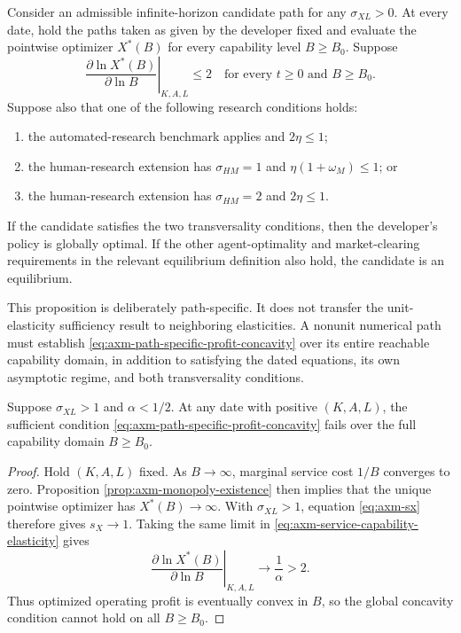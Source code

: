 \begin{proposition}
\label{prop:axm-path-specific-sufficiency}
Consider an admissible infinite-horizon candidate path for any
\(\sigma_{XL}>0\). At every date, hold the paths taken as given by the
developer fixed and evaluate the pointwise optimizer \(X^*(B)\) for every
capability level \(B\geq B_0\). Suppose
\begin{equation}
 \left.\frac{\partial\ln X^*(B)}{\partial\ln B}\right|_{K,A,L}
 \leq2
 \quad\text{for every }t\geq0\text{ and }B\geq B_0.
 \label{eq:axm-path-specific-profit-concavity}
\end{equation}
Suppose also that one of the following research conditions holds:
\begin{enumerate}
 \item the automated-research benchmark applies and \(2\eta\leq1\);
 \item the human-research extension has
 \(\sigma_{HM}=1\) and \(\eta(1+\omega_M)\leq1\); or
 \item the human-research extension has
 \(\sigma_{HM}=2\) and \(2\eta\leq1\).
\end{enumerate}
If the candidate satisfies the two transversality conditions, then the
developer's policy is globally optimal. If the other agent-optimality and
market-clearing requirements in the relevant equilibrium definition also
hold, the candidate is an equilibrium.
\end{proposition}

This proposition is deliberately path-specific. It does not transfer the
unit-elasticity sufficiency result to neighboring elasticities. A nonunit
numerical path must establish \eqref{eq:axm-path-specific-profit-concavity}
over its entire reachable capability domain, in addition to satisfying the
dated equations, its own asymptotic regime, and both transversality conditions.

\begin{proposition}
\label{prop:axm-gross-substitutes-concavity-gate}
Suppose \(\sigma_{XL}>1\) and \(\alpha<1/2\). At any date with positive
\((K,A,L)\), the sufficient condition
\eqref{eq:axm-path-specific-profit-concavity} fails over the full capability
domain \(B\geq B_0\).
\end{proposition}

\begin{proof}
Hold \((K,A,L)\) fixed. As \(B\to\infty\), marginal service cost \(1/B\)
converges to zero. Proposition \ref{prop:axm-monopoly-existence} then implies
that the unique pointwise optimizer has \(X^*(B)\to\infty\). With
\(\sigma_{XL}>1\), equation \eqref{eq:axm-sx} therefore gives \(s_X\to1\).
Taking the same limit in
\eqref{eq:axm-service-capability-elasticity} gives
\[
 \left.\frac{\partial\ln X^*(B)}{\partial\ln B}\right|_{K,A,L}
 \longrightarrow \frac{1}{\alpha}>2.
\]
Thus optimized operating profit is eventually convex in \(B\), so the global
concavity condition cannot hold on all \(B\geq B_0\).
\end{proof}


